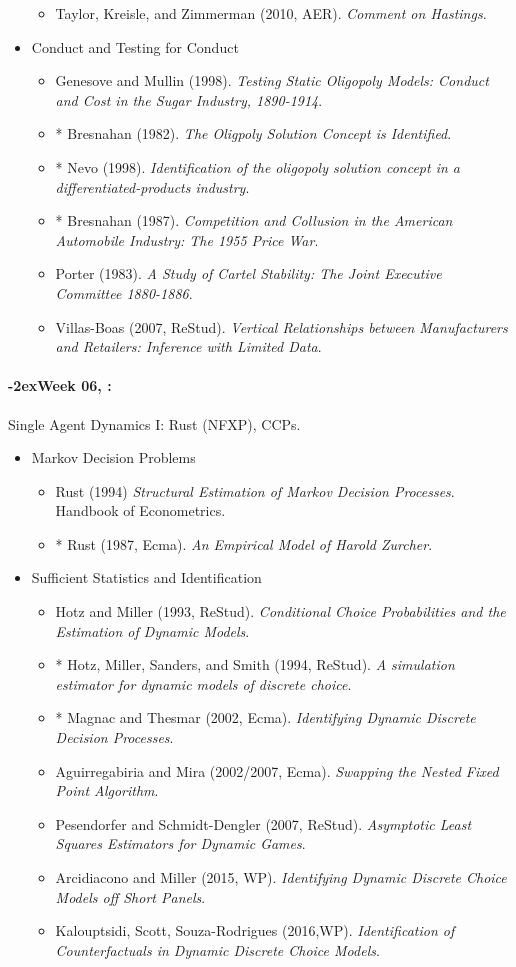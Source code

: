 \documentclass[11pt]{article}
\newcommand{\week}[1]{%
  \paragraph*{\kern-2ex\quad #1, \syldate{\today}:}%
  \ifdim\wd1=\wd\THURSDAY
    \AdvanceDate[7]
  \else
    \AdvanceDate[7]
  \fi%
}
\begin{document}
\begin{itemize}
\begin{itemize}
\item Taylor, Kreisle, and Zimmerman (2010, AER). \textit{Comment on Hastings}.
\end{itemize}
\item Conduct and Testing for Conduct
\begin{itemize}
\item Genesove and Mullin (1998). \textit{Testing Static Oligopoly Models: Conduct and Cost in the Sugar Industry, 1890-1914}.
\item * Bresnahan (1982). \textit{The Oligpoly Solution Concept is Identified}.
\item * Nevo (1998). \textit{Identification of the oligopoly solution concept in a differentiated-products industry}.
\item * Bresnahan (1987). \textit{Competition and Collusion in the American Automobile Industry: The 1955 Price War}.
\item Porter (1983). \textit{A Study of Cartel Stability: The Joint Executive Committee 1880-1886}.
\item Villas-Boas (2007, ReStud). \textit{Vertical Relationships between Manufacturers and Retailers: Inference with Limited Data}.
\end{itemize}
\end{itemize}


\week{Week 06} Single Agent Dynamics I: Rust (NFXP), CCPs.
\begin{itemize}
\item Markov Decision Problems
\begin{itemize}
\item Rust (1994) \textit{Structural Estimation of Markov Decision Processes}. Handbook of Econometrics.
\item * Rust (1987, Ecma). \textit{An Empirical Model of Harold Zurcher}.
\end{itemize}
\item Sufficient Statistics and Identification
\begin{itemize}
\item Hotz and Miller (1993, ReStud). \textit{Conditional Choice Probabilities and the Estimation of Dynamic Models}.
\item * Hotz, Miller, Sanders, and Smith (1994, ReStud). \textit{A simulation estimator for dynamic models of discrete choice}.
\item * Magnac and Thesmar (2002, Ecma). \textit{Identifying Dynamic Discrete Decision Processes}.
\item Aguirregabiria and Mira (2002/2007, Ecma). \textit{Swapping the Nested Fixed Point Algorithm}.
\item Pesendorfer and Schmidt-Dengler (2007, ReStud). \textit{Asymptotic Least Squares Estimators for Dynamic Games}.
\item Arcidiacono and Miller (2015, WP). \textit{Identifying Dynamic Discrete Choice Models
off Short Panels}.
\item Kalouptsidi, Scott, Souza-Rodrigues (2016,WP). \textit{Identification of Counterfactuals
in Dynamic Discrete Choice Models}.
\end{itemize}
\end{itemize}
\end{document}
